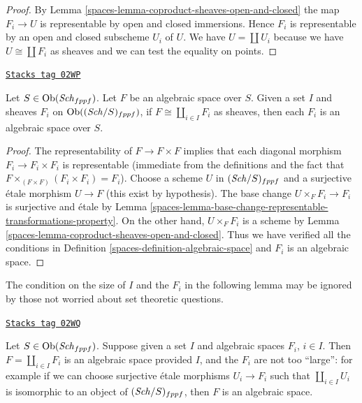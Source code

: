 \begin{proof}

By Lemma \ref{spaces-lemma-coproduct-sheaves-open-and-closed}
the map $F_i \to U$ is representable by open and closed immersions.
Hence $F_i$ is representable by an open and closed subscheme $U_i$ of $U$.
We have $U = \coprod U_i$ because we have $U \cong \coprod F_i$
as sheaves and we can test the equality on points.
\end{proof}

\begin{lemma}
\label{spaces-lemma-algebraic-space-coproduct-sheaves}
\href{https://stacks.math.columbia.edu/tag/02WP}{\texttt{Stacks tag 02WP}}

Let $S \in \operatorname{Ob}(\mathit{Sch}_{fppf})$.
Let $F$ be an algebraic space over $S$.
Given a set $I$ and sheaves $F_i$ on
$\operatorname{Ob}((\mathit{Sch}/S)_{fppf})$,
if $F \cong \coprod_{i\in I} F_i$ as sheaves,
then each $F_i$ is an algebraic space over $S$.
\end{lemma}

\begin{proof}

The representability of $F \to F \times F$ implies that each diagonal morphism
$F_i \to F_i \times F_i$ is representable (immediate from the definitions
and the fact that $F \times_{(F \times F)} (F_i \times F_i) = F_i$).
Choose a scheme $U$ in $(\mathit{Sch}/S)_{fppf}$ and a surjective
\'etale morphism $U \to F$ (this exist by hypothesis).
The base change $U \times_F F_i \to F_i$ is surjective and \'etale
by Lemma \ref{spaces-lemma-base-change-representable-transformations-property}.
On the other hand, $U \times_F F_i$ is a scheme by
Lemma \ref{spaces-lemma-coproduct-sheaves-open-and-closed}.
Thus we have verified all the conditions in
Definition \ref{spaces-definition-algebraic-space}
and $F_i$ is an algebraic space.
\end{proof}

The condition on the size of $I$ and the $F_i$ in the
following lemma may be ignored by those not worried about
set theoretic questions.

\begin{lemma}
\label{spaces-lemma-coproduct-algebraic-spaces}
\href{https://stacks.math.columbia.edu/tag/02WQ}{\texttt{Stacks tag 02WQ}}

Let $S \in \operatorname{Ob}(\mathit{Sch}_{fppf})$.
Suppose given a set $I$ and algebraic spaces $F_i$, $i \in I$.
Then $F = \coprod_{i \in I} F_i$ is an algebraic space
provided $I$, and the $F_i$ are not too ``large'': for example if we
can choose surjective \'etale morphisms $U_i \to F_i$ such that
$\coprod_{i \in I} U_i$ is isomorphic to an object of
$(\mathit{Sch}/S)_{fppf}$, then $F$ is an algebraic space.
\end{lemma}

